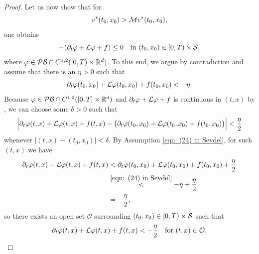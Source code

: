 \begin{proof}
    Let us now show that for
    \begin{equation}
        v^* (t_0,x_0) > \mathcal{M} v^*(t_0,x_0),
        \label{eqn: Theorem 4.8, initial assumption}
    \end{equation}
    one obtains
    \begin{equation}
        - (\partial_t \varphi + \mathcal{L} \varphi + f) \leq 0 \quad \text{in }(t_0,x_0) \in [0,T) \times \mathcal{S},
        \label{eqn: Theorem 4.8, main goal subsolution part}
    \end{equation}
    where $\varphi \in \mathcal{PB} \cap C^{1,2}([0,T) \times \mathbb{R}^d)$. To this end, we argue by contradiction and assume that there is an $\eta > 0$ such that 
    \begin{equation}
        \partial_t \varphi(t_0,x_0) + \mathcal{L} \varphi(t_0,x_0) + f(t_0,x_0) < - \eta.
        \label{eqn: (24) in Seydel}
    \end{equation}
    Because $\varphi \in \mathcal{PB} \cap C^{1,2}([0,T] \times \mathbb{R}^d)$ and $\partial_t \varphi + \mathcal{L} \varphi + f$ is continuous in $(t,x)$ by , we can choose some $\delta > 0$ such that 
    \begin{equation*}
        \Big| \partial_t \varphi (t,x) + \mathcal{L} \varphi (t,x) + f(t,x) - \big( \partial_t \varphi (t_0,x_0) + \mathcal{L} \varphi (t_0,x_0) + f(t_0,x_0) \big) \Big| < \frac \eta 2
    \end{equation*}
    whenever $|(t,x) - (t_0,x_0)| < \delta$. By Assumption \eqref{eqn: (24) in Seydel}, for such $(t,x)$ we have 
    \begin{align*}
        \partial_t \varphi (t,x) + \mathcal{L} \varphi (t,x) + f(t,x) & < \partial_t \varphi (t_0,x_0) + \mathcal{L} \varphi (t_0,x_0) + f(t_0,x_0) + \frac{\eta}{2} \\
        &\overset{\eqref{eqn: (24) in Seydel}}{<} - \eta +\frac{\eta}{2} \\
        &= -\frac{\eta}{2},
    \end{align*}
    so there exists an open set $\mathcal O$ surrounding $(t_0,x_0) \in [0,T) \times \mathcal{S}$ such that 
    \begin{equation}
        \partial_t \varphi (t,x) + \mathcal{L} \varphi (t,x) + f(t,x) < - \frac{\eta}{2} \quad \text{for } (t,x) \in \mathcal{O}. 
        \label{eqn: Theorem 4.8, temporary result 4}
    \end{equation}


\end{proof}
